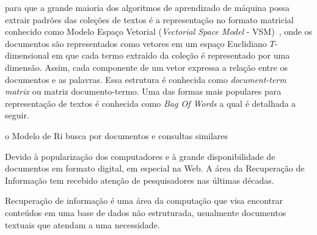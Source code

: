 para que a grande maioria dos algoritmos de aprendizado de máquina possa extrair padrões das coleções de textos é a representação no formato matricial conhecido como Modelo Espaço Vetorial (\textit{Vectorial Space Model} - VSM)~\cite{Rezende2003}, onde os documentos são representados como vetores em um espaço Euclidiano $T$-dimensional em que cada termo extraído da coleção é representado por uma dimensão. Assim, cada componente de um vetor expressa a relação entre os documentos e as palavras. Essa estrutura é conhecida como \textit{document-term matrix} ou matriz documento-termo. Uma das formas mais populares para representação de textos é conhecida como \textit{Bag Of Words} a qual é detalhada a seguir.



























o Modelo de Ri busca por documentos e consultas similares


Devido à popularização dos computadores e à grande disponibilidade de documentos em formato digital, em especial na Web. A área da Recuperação de Informação tem recebido atenção de pesquisadores nas últimas décadas.



Recuperação de informação é uma área da computação que visa encontrar conteúdos em uma base de dados não estruturada, usualmente documentos textuais que atendam a uma necessidade. 


